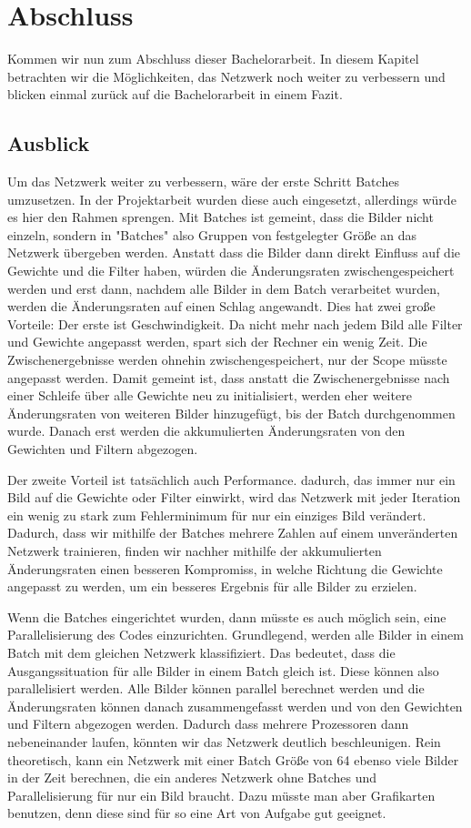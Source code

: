 \documentclass[12pt]{article}
\begin{document}
\section{Abschluss}
Kommen wir nun zum Abschluss dieser Bachelorarbeit. In diesem Kapitel betrachten wir die Möglichkeiten, das Netzwerk noch weiter zu verbessern und blicken einmal zurück auf die Bachelorarbeit in einem Fazit.

\subsection{Ausblick}
Um das Netzwerk weiter zu verbessern, wäre der erste Schritt Batches umzusetzen. In der Projektarbeit wurden diese auch eingesetzt, allerdings würde es hier den Rahmen sprengen. Mit Batches ist gemeint, dass die Bilder nicht einzeln, sondern in "Batches" also Gruppen von festgelegter Größe an das Netzwerk übergeben werden. Anstatt dass die Bilder dann direkt Einfluss auf die Gewichte und die Filter haben, würden die Änderungsraten zwischengespeichert werden und erst dann, nachdem alle Bilder in dem Batch verarbeitet wurden, werden die Änderungsraten auf einen Schlag angewandt. Dies hat zwei große Vorteile: Der erste ist Geschwindigkeit. Da nicht mehr nach jedem Bild alle Filter und Gewichte angepasst werden, spart sich der Rechner ein wenig Zeit. Die Zwischenergebnisse werden ohnehin zwischengespeichert, nur der Scope müsste angepasst werden. Damit gemeint ist, dass anstatt die Zwischenergebnisse nach einer Schleife über alle Gewichte neu zu initialisiert, werden eher weitere Änderungsraten von weiteren Bilder hinzugefügt, bis der Batch durchgenommen wurde. Danach erst werden die akkumulierten Änderungsraten von den Gewichten und Filtern abgezogen.

Der zweite Vorteil ist tatsächlich auch Performance. dadurch, das immer nur ein Bild auf die Gewichte oder Filter einwirkt, wird das Netzwerk mit jeder Iteration ein wenig zu stark zum Fehlerminimum für nur ein einziges Bild verändert. Dadurch, dass wir mithilfe der Batches mehrere Zahlen auf einem unveränderten Netzwerk trainieren, finden wir nachher mithilfe der akkumulierten Änderungsraten einen besseren Kompromiss, in welche Richtung die Gewichte angepasst zu werden, um ein besseres Ergebnis für alle Bilder zu erzielen. 

Wenn die Batches eingerichtet wurden, dann müsste es auch möglich sein, eine Parallelisierung des Codes einzurichten. Grundlegend, werden alle Bilder in einem Batch mit dem gleichen Netzwerk klassifiziert. Das bedeutet, dass die Ausgangssituation für alle Bilder in einem Batch gleich ist. Diese können also parallelisiert werden. Alle Bilder können parallel berechnet werden und die Änderungsraten können danach zusammengefasst werden und von den Gewichten und Filtern abgezogen werden. Dadurch dass mehrere Prozessoren dann nebeneinander laufen, könnten wir das Netzwerk deutlich beschleunigen. Rein theoretisch, kann ein Netzwerk mit einer Batch Größe von 64 ebenso viele Bilder in der Zeit berechnen, die ein anderes Netzwerk ohne Batches und Parallelisierung für nur ein Bild braucht. Dazu müsste man aber Grafikarten benutzen, denn diese sind für so eine Art von Aufgabe gut geeignet. 
\end{document}
